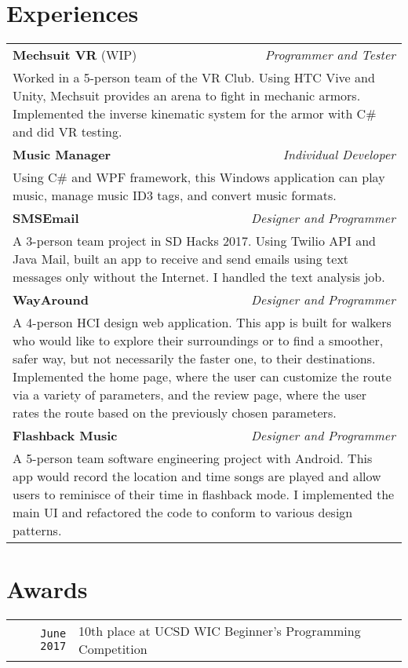 \documentclass[12pt, letterpaper]{article}
\begin{document}
\section{Experiences}
\smallskip
\noindent
\begin{tabular}{l r}	
\textbf{\large Mechsuit VR} {\small (WIP)} & \textit{Programmer and Tester} \\
\multicolumn{2}{p{\linewidth}}{Worked in a 5-person team of the VR Club. Using HTC Vive and Unity, Mechsuit provides an arena to fight in mechanic armors. Implemented the inverse kinematic system for the armor with C\# and did VR testing.} \\
\textbf{\large Music Manager} & \textit{Individual Developer} \\
\multicolumn{2}{p{\linewidth}}{Using C\# and WPF framework, this Windows application can play music, manage music ID3 tags, and convert music formats.} \\
\textbf{\large SMSEmail} & \textit{Designer and Programmer} \\
\multicolumn{2}{p{\linewidth}}{A 3-person team project in SD Hacks 2017. Using Twilio API and Java Mail, built an app to receive and send emails using text messages only without the Internet. I handled the text analysis job.} \\
\textbf{\large WayAround} & \textit{Designer and Programmer} \\
\multicolumn{2}{p{\linewidth}}{A 4-person HCI design web application. This app is built for walkers who would like to explore their surroundings or to find a smoother, safer way, but not necessarily the faster one, to their destinations. Implemented the home page, where the user can customize the route via a variety of parameters, and the review page, where the user rates the route based on the previously chosen parameters.} \\
\textbf{\large Flashback Music} & \textit{Designer and Programmer} \\
\multicolumn{2}{p{\linewidth}}{A 5-person team software engineering project with Android. This app would record the location and time songs are played and allow users to reminisce of their time in flashback mode. I implemented the main UI and refactored the code to conform to various design patterns.}
\end{tabular}

\bigskip

\section{Awards}
\smallskip
\noindent
\begin{tabularx}{\linewidth}{r | X}
	\texttt{June 2017} & 10th place at UCSD WIC Beginner's Programming Competition
\end{tabularx}
\end{document}

